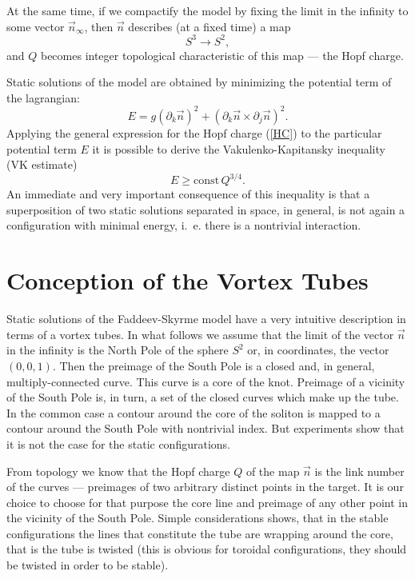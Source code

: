 \documentclass[a4paper,12pt]{article}
\newcommand{\prj}{\partial_{j}}
\newcommand{\prk}{\partial_{k}}
\begin{document}
        At the same time, if we compactify the model by fixing
        the limit 
        in the infinity to some vector
    $ \vec{n}_{\infty} $,
        then
    $ \vec{n} $ 
        describes (at a fixed time) a map
\begin{equation}
    S^{3} \to S^{2} ,
\end{equation}
        and 
    $ Q $
        becomes integer topological characteristic of this map ---
        the Hopf charge.

        Static solutions of the model are obtained by minimizing
        the potential term of the lagrangian:
\begin{equation}
    E = g (\prk \vec{n})^{2} + (\prk \vec{n} \times \prj \vec{n})^{2} .
\end{equation}
        Applying the general expression for the Hopf charge 
(\ref{HC})
        to the particular potential term 
    $ E $
        it is possible to derive the Vakulenko-Kapitansky inequality
        (VK estimate)
\begin{equation}
\label{VK}
    E \ge \text{const} \, Q^{3/4}.
\end{equation}
        An immediate and very important consequence of this inequality
        is that a superposition of two static solutions separated
        in space, in general, is not again a configuration
        with minimal energy, i.~e. there is a nontrivial interaction.

\section{Conception of the Vortex Tubes}
        Static solutions of the Faddeev-Skyrme model have a very 
        intuitive description in terms of a vortex tubes.
        In what follows we assume that the limit of the vector 
    $ \vec{n} $
        in the infinity is the North Pole of the sphere 
    $ S^{2} $
        or, in coordinates, the vector 
    $ (0,0,1) $.
        Then the preimage of the South Pole is a closed and, in general,
        multiply-connected curve. This curve is a core of the knot.
        Preimage of a vicinity of the South Pole is, in turn, a set
        of the closed curves which make up the tube. In the common case
        a contour around the core of the soliton
        is mapped to a contour around the South Pole with nontrivial index.
        But experiments 
\cite{}
        show that it is not the case for the static
        configurations.

        From topology we know that the Hopf charge 
    $ Q $
        of the map 
    $ \vec{n} $
        is the link number of the curves --- preimages of two arbitrary
        distinct points in the target. It is our choice to choose for that
        purpose the core line and preimage of any other point in the vicinity
        of the South Pole.
        Simple considerations shows, that in the stable configurations the
        lines that constitute the tube are wrapping around the core, that is the
        tube is twisted (this is obvious for toroidal configurations,
	they should be twisted in order to be stable).
\end{document}
